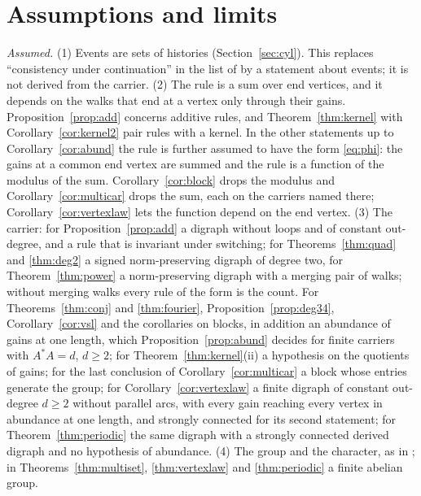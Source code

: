 \section{Assumptions and limits}\label{sec:limits}

\emph{Assumed.} (1) Events are sets of histories (Section~\ref{sec:cyl}). This replaces ``consistency under continuation'' in the list of \cite{g9} by a statement about events; it is not derived from the carrier. (2) The rule is a sum over end vertices, and it depends on the walks that end at a vertex only through their gains. Proposition~\ref{prop:add} concerns additive rules, and Theorem~\ref{thm:kernel} with Corollary~\ref{cor:kernel2} pair rules with a kernel. In the other statements up to Corollary~\ref{cor:abund} the rule is further assumed to have the form \eqref{eq:phi}: the gains at a common end vertex are summed and the rule is a function of the modulus of the sum. Corollary~\ref{cor:block} drops the modulus and Corollary~\ref{cor:multicar} drops the sum, each on the carriers named there; Corollary~\ref{cor:vertexlaw} lets the function depend on the end vertex. (3) The carrier: for Proposition~\ref{prop:add} a digraph without loops and of constant out-degree, and a rule that is invariant under switching; for Theorems~\ref{thm:quad} and \ref{thm:deg2} a signed norm-preserving digraph of degree two, for Theorem~\ref{thm:power} a norm-preserving digraph with a merging pair of walks; without merging walks every rule of the form is the count. For Theorems~\ref{thm:conj} and \ref{thm:fourier}, Proposition~\ref{prop:deg34}, Corollary~\ref{cor:vsl} and the corollaries on blocks, in addition an abundance of gains at one length, which Proposition~\ref{prop:abund} decides for finite carriers with $A^*A=d$, $d\ge2$; for Theorem~\ref{thm:kernel}(ii) a hypothesis on the quotients of gains; for the last conclusion of Corollary~\ref{cor:multicar} a block whose entries generate the group; for Corollary~\ref{cor:vertexlaw} a finite digraph of constant out-degree $d\ge2$ without parallel arcs, with every gain reaching every vertex in abundance at one length, and strongly connected for its second statement; for Theorem~\ref{thm:periodic} the same digraph with a strongly connected derived digraph and no hypothesis of abundance. (4) The group and the character, as in \cite{g8}; in Theorems~\ref{thm:multiset}, \ref{thm:vertexlaw} and \ref{thm:periodic} a finite abelian group.

